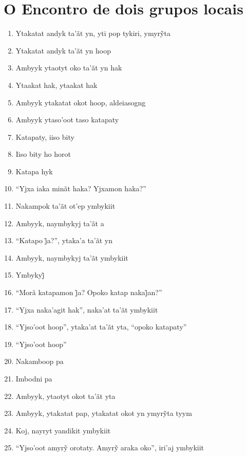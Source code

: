  \chapter{O Encontro de dois grupos locais}
\begin{enumerate}
 \item Ytakatat andyk ta’ãt yn, yti pop tykiri, ymyrỹta
 \item Ytakatat andyk ta'ãt yn hoop
 \item Ambyyk ytaotyt oko ta'ãt yn hak
 \item Ytaakat hak, ytaakat hak
 \begin{center}\end{center}
 \item Ambyyk ytakatat okot hoop, aldeiasogng
 \item Ambyyk ytaso'oot taso katapaty
 \item Katapaty, iiso bity
 \item Iiso bity ho horot
 \item Katapa hyk
 \item ``Yjxa iaka minãt haka? Yjxamon haka?''
 \begin{center}\end{center}
 \item Nakampok ta'ãt ot'ep ymbykiit
 \item Ambyyk, naymbykyj ta'ãt a
 \item ``Katapo j̃a?'', ytaka’a ta’ãt yn
 \item Ambyyk, naymbykyj ta'ãt ymbykiit
 \item Ymbykyj̃
 \item ``Morã katapamon j̃a? Opoko katap nakaj̃an?''
 \item ``Yjxa naka'agit hak'', naka'at ta'ãt ymbykiit
 \item ``Yjso'oot hoop'', ytaka'at ta'ãt yta, ``opoko katapaty''
 \item ``Yjso'oot hoop''
 \begin{center}\end{center}
 \item Nakamboop pa
 \item Imbodni pa
 \item Ambyyk, ytaotyt okot ta'ãt yta
 \item Ambyyk, ytakatat pap, ytakatat okot yn ymyrỹta tyym
 \item Koj, nayryt yandikit ymbykiit
 \item ``Yjso’oot amyrỹ orotaty. Amyrỹ araka oko'', iri’aj ymbykiit
 \begin{center}\end{center}

\end{enumerate}
